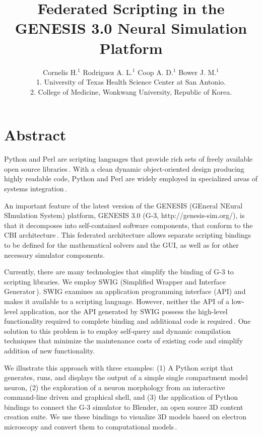 \documentclass[12pt]{article}
\begin{document}
\title{\bf Federated Scripting in the GENESIS 3.0 Neural Simulation
  Platform}

\author{Cornelis H.$^1$ Rodriguez A. L.$^1$ Coop A. D.$^1$ Bower J. M.$^1$\\
  {\small 1. University of Texas Health Science Center at San Antonio.} \\
  {\small 2. College of Medicine, Wonkwang University, Republic of Korea.}
}

\maketitle
{}
\newpage
\section*{Abstract}
Python and Perl are scripting languages that provide rich sets of
freely available open source
libraries\,\cite{langtangen04:_python_scrip_comput_scien,valiente09:_combin_patter_match_algor_comput}.
With a clean dynamic object-oriented design producing highly readable
code, Python and Perl are widely employed in specialized areas of
systems
integration\,\cite{thiruvathukal01:_web_progr_python, lee07:_open_sourc_devel_lamp}.

An important feature of the latest version of the GENESIS (GEneral
NEural SImulation System) platform, GENESIS 3.0 (G-3,
http://genesis-sim.org/), is that it decomposes into self-contained
software components, that conform to the CBI
architecture\,\cite{cornelis08:_cbi_archit_comput_simul_realis}.  This
federated architecture allows separate scripting bindings to be
defined for the mathematical solvers and the GUI, as well as for other
necessary simulator components.

Currently, there are many technologies that simplify the binding of
G-3 to scripting libraries.  We employ SWIG (Simplified Wrapper and
Interface Generator\,\cite{08:_simpl_wrapp_inter_gener}).  SWIG
examines an application programming interface (API) and makes it
available to a scripting language.  However, neither the API of a
low-level application, nor the API generated by SWIG possess the
high-level functionality required to complete binding and additional
code is required\,\cite{08:_swig_python,08:_swig_perl}. One
solution to this problem is to employ self-query and dynamic
compilation techniques that minimize the maintenance costs of existing
code and simplify addition of new functionality.

We illustrate this approach with three examples: (1) A Python script
that generates, runs, and displays the output of a simple single
compartment model neuron, (2) the exploration of a neuron morphology
from an interactive command-line driven and graphical shell, and (3)
the application of Python bindings to connect the G-3 simulator to
Blender, an open source 3D content creation suite.  We use these
bindings to visualize 3D models based on electron microscopy and
convert them to computational
models\,\cite{cornelis08:_model_neuros_genes}.
\end{document}
